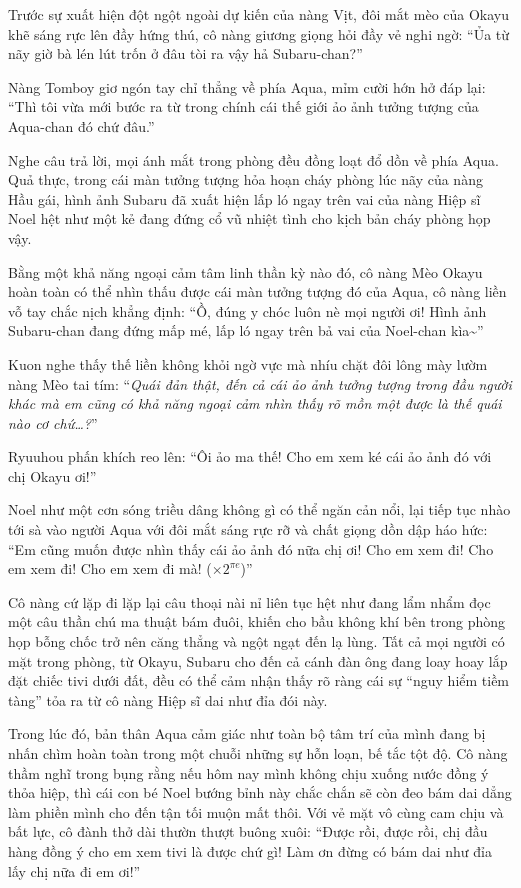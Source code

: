 \documentclass[../main.tex]{subfiles}
\begin{document}
Trước sự xuất hiện đột ngột ngoài dự kiến của nàng Vịt, đôi mắt mèo của Okayu khẽ sáng rực lên đầy hứng thú, cô nàng giương giọng hỏi đầy vẻ nghi ngờ: ``Ủa từ nãy giờ bà lén lút trốn ở đâu tòi ra vậy hả Subaru-chan?''

Nàng Tomboy giơ ngón tay chỉ thẳng về phía Aqua, mỉm cười hớn hở đáp lại: ``Thì tôi vừa mới bước ra từ trong chính cái thế giới ảo ảnh tưởng tượng của Aqua-chan đó chứ đâu.''

Nghe câu trả lời, mọi ánh mắt trong phòng đều đồng loạt đổ dồn về phía Aqua. Quả thực, trong cái màn tưởng tượng hỏa hoạn cháy phòng lúc nãy của nàng Hầu gái, hình ảnh Subaru đã xuất hiện lấp ló ngay trên vai của nàng Hiệp sĩ Noel hệt như một kẻ đang đứng cổ vũ nhiệt tình cho kịch bản cháy phòng họp vậy.


Bằng một khả năng ngoại cảm tâm linh thần kỳ nào đó, cô nàng Mèo Okayu hoàn toàn có thể nhìn thấu được cái màn tưởng tượng đó của Aqua, cô nàng liền vỗ tay chắc nịch khẳng định: ``Ồ, đúng y chóc luôn nè mọi người ơi! Hình ảnh Subaru-chan đang đứng mấp mé, lấp ló ngay trên bả vai của Noel-chan kìa\~{}''

Kuon nghe thấy thế liền không khỏi ngờ vực mà nhíu chặt đôi lông mày lườm nàng Mèo tai tím: ``\textit{Quái đản thật, đến cả cái ảo ảnh tưởng tượng trong đầu người khác mà em cũng có khả năng ngoại cảm nhìn thấy rõ mồn một được là thế quái nào cơ chứ\dots?}''

Ryuuhou phấn khích reo lên: ``Ôi ảo ma thế! Cho em xem ké cái ảo ảnh đó với chị Okayu ơi!''

Noel như một cơn sóng triều dâng không gì có thể ngăn cản nổi, lại tiếp tục nhào tới sà vào người Aqua với đôi mắt sáng rực rỡ và chất giọng dồn dập háo hức: ``Em cũng muốn được nhìn thấy cái ảo ảnh đó nữa chị ơi! Cho em xem đi! Cho em xem đi! Cho em xem đi mà! (\(\times 2^{\pi e}\))''

Cô nàng cứ lặp đi lặp lại câu thoại nài nỉ liên tục hệt như đang lẩm nhẩm đọc một câu thần chú ma thuật bám đuôi, khiến cho bầu không khí bên trong phòng họp bỗng chốc trở nên căng thẳng và ngột ngạt đến lạ lùng. Tất cả mọi người có mặt trong phòng, từ Okayu, Subaru cho đến cả cánh đàn ông đang loay hoay lắp đặt chiếc tivi dưới đất, đều có thể cảm nhận thấy rõ ràng cái sự ``nguy hiểm tiềm tàng'' tỏa ra từ cô nàng Hiệp sĩ dai như đỉa đói này.

Trong lúc đó, bản thân Aqua cảm giác như toàn bộ tâm trí của mình đang bị nhấn chìm hoàn toàn trong một chuỗi những sự hỗn loạn, bế tắc tột độ. Cô nàng thầm nghĩ trong bụng rằng nếu hôm nay mình không chịu xuống nước đồng ý thỏa hiệp, thì cái con bé Noel bướng bỉnh này chắc chắn sẽ còn đeo bám dai dẳng làm phiền mình cho đến tận tối muộn mất thôi. Với vẻ mặt vô cùng cam chịu và bất lực, cô đành thở dài thườn thượt buông xuôi: ``Được rồi, được rồi, chị đầu hàng đồng ý cho em xem tivi là được chứ gì! Làm ơn đừng có bám dai như đỉa lấy chị nữa đi em ơi!''
\end{document}
